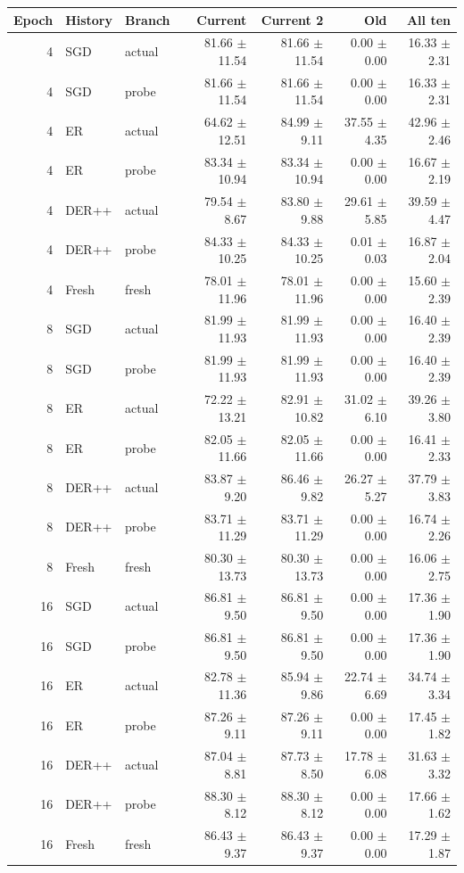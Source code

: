 \begin{tabular}{rllrrrr}
\toprule
Epoch & History & Branch & Current & Current 2 & Old & All ten \\
\midrule
4 & SGD & actual & 81.66 $\pm$ 11.54 & 81.66 $\pm$ 11.54 & 0.00 $\pm$ 0.00 & 16.33 $\pm$ 2.31 \\
4 & SGD & probe & 81.66 $\pm$ 11.54 & 81.66 $\pm$ 11.54 & 0.00 $\pm$ 0.00 & 16.33 $\pm$ 2.31 \\
4 & ER & actual & 64.62 $\pm$ 12.51 & 84.99 $\pm$ 9.11 & 37.55 $\pm$ 4.35 & 42.96 $\pm$ 2.46 \\
4 & ER & probe & 83.34 $\pm$ 10.94 & 83.34 $\pm$ 10.94 & 0.00 $\pm$ 0.00 & 16.67 $\pm$ 2.19 \\
4 & DER++ & actual & 79.54 $\pm$ 8.67 & 83.80 $\pm$ 9.88 & 29.61 $\pm$ 5.85 & 39.59 $\pm$ 4.47 \\
4 & DER++ & probe & 84.33 $\pm$ 10.25 & 84.33 $\pm$ 10.25 & 0.01 $\pm$ 0.03 & 16.87 $\pm$ 2.04 \\
4 & Fresh & fresh & 78.01 $\pm$ 11.96 & 78.01 $\pm$ 11.96 & 0.00 $\pm$ 0.00 & 15.60 $\pm$ 2.39 \\
8 & SGD & actual & 81.99 $\pm$ 11.93 & 81.99 $\pm$ 11.93 & 0.00 $\pm$ 0.00 & 16.40 $\pm$ 2.39 \\
8 & SGD & probe & 81.99 $\pm$ 11.93 & 81.99 $\pm$ 11.93 & 0.00 $\pm$ 0.00 & 16.40 $\pm$ 2.39 \\
8 & ER & actual & 72.22 $\pm$ 13.21 & 82.91 $\pm$ 10.82 & 31.02 $\pm$ 6.10 & 39.26 $\pm$ 3.80 \\
8 & ER & probe & 82.05 $\pm$ 11.66 & 82.05 $\pm$ 11.66 & 0.00 $\pm$ 0.00 & 16.41 $\pm$ 2.33 \\
8 & DER++ & actual & 83.87 $\pm$ 9.20 & 86.46 $\pm$ 9.82 & 26.27 $\pm$ 5.27 & 37.79 $\pm$ 3.83 \\
8 & DER++ & probe & 83.71 $\pm$ 11.29 & 83.71 $\pm$ 11.29 & 0.00 $\pm$ 0.00 & 16.74 $\pm$ 2.26 \\
8 & Fresh & fresh & 80.30 $\pm$ 13.73 & 80.30 $\pm$ 13.73 & 0.00 $\pm$ 0.00 & 16.06 $\pm$ 2.75 \\
16 & SGD & actual & 86.81 $\pm$ 9.50 & 86.81 $\pm$ 9.50 & 0.00 $\pm$ 0.00 & 17.36 $\pm$ 1.90 \\
16 & SGD & probe & 86.81 $\pm$ 9.50 & 86.81 $\pm$ 9.50 & 0.00 $\pm$ 0.00 & 17.36 $\pm$ 1.90 \\
16 & ER & actual & 82.78 $\pm$ 11.36 & 85.94 $\pm$ 9.86 & 22.74 $\pm$ 6.69 & 34.74 $\pm$ 3.34 \\
16 & ER & probe & 87.26 $\pm$ 9.11 & 87.26 $\pm$ 9.11 & 0.00 $\pm$ 0.00 & 17.45 $\pm$ 1.82 \\
16 & DER++ & actual & 87.04 $\pm$ 8.81 & 87.73 $\pm$ 8.50 & 17.78 $\pm$ 6.08 & 31.63 $\pm$ 3.32 \\
16 & DER++ & probe & 88.30 $\pm$ 8.12 & 88.30 $\pm$ 8.12 & 0.00 $\pm$ 0.00 & 17.66 $\pm$ 1.62 \\
16 & Fresh & fresh & 86.43 $\pm$ 9.37 & 86.43 $\pm$ 9.37 & 0.00 $\pm$ 0.00 & 17.29 $\pm$ 1.87 \\
\bottomrule
\end{tabular}
